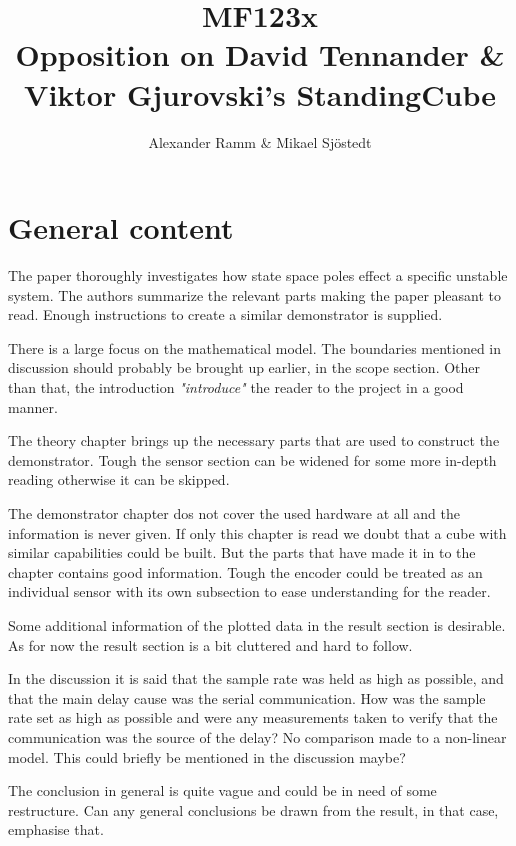 \documentclass{article}
\begin{document}
\title{MF123x\\ Opposition on David Tennander \& Viktor Gjurovski's StandingCube \\}
\author{Alexander Ramm \& Mikael Sjöstedt}

\maketitle
\clearpage

\section{General content}
The paper thoroughly investigates how state space poles effect a specific unstable system. The authors summarize the relevant parts making the paper pleasant to read. Enough instructions to create a similar demonstrator is supplied.

There is a large focus on the mathematical model. The boundaries mentioned in discussion should probably be brought up earlier, in the scope section. Other than that, the introduction \textit{"introduce"} the reader to the project in a good manner.

The theory chapter brings up the necessary parts that are used to construct the demonstrator. Tough the sensor section can be widened for some more in-depth reading otherwise it can be skipped.

The demonstrator chapter dos not cover the used hardware at all and the information is never given. If only this chapter is read we doubt that a cube with similar capabilities could be built. But the parts that have made it in to the chapter contains good information. Tough the encoder could be treated as an individual sensor with its own subsection to ease understanding for the reader. 

Some additional information of the plotted data in the result section is desirable. As for now the result section is a bit cluttered and hard to follow. 

In the discussion it is said that the sample rate was held as high as possible, and that the main delay cause was the serial communication. How was the sample rate set as high as possible and were any measurements taken to verify that the communication was the source of the delay? No comparison made to a non-linear model. This could briefly be mentioned in the discussion maybe?

The conclusion in general is quite vague and could be in need of some restructure. Can any general conclusions be drawn from the result, in that case, emphasise that.
\end{document}
